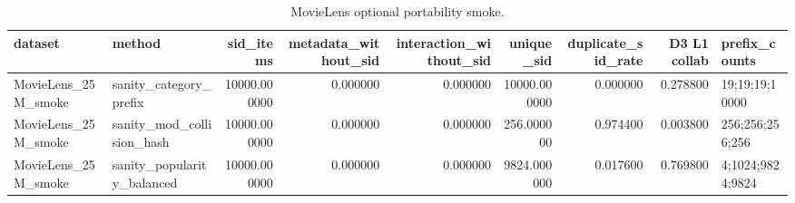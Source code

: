 \begin{table}
\caption{MovieLens optional portability smoke.}
\label{tab:movielens-portability}
\begin{tabular}{llrrrrrrl}
\toprule
dataset & method & sid\_items & metadata\_without\_sid & interaction\_without\_sid & unique\_sid & duplicate\_sid\_rate & D3 L1 collab & prefix\_counts \\
\midrule
MovieLens\_25M\_smoke & sanity\_category\_prefix & 10000.000000 & 0.000000 & 0.000000 & 10000.000000 & 0.000000 & 0.278800 & 19;19;19;10000 \\
MovieLens\_25M\_smoke & sanity\_mod\_collision\_hash & 10000.000000 & 0.000000 & 0.000000 & 256.000000 & 0.974400 & 0.003800 & 256;256;256;256 \\
MovieLens\_25M\_smoke & sanity\_popularity\_balanced & 10000.000000 & 0.000000 & 0.000000 & 9824.000000 & 0.017600 & 0.769800 & 4;1024;9824;9824 \\
\bottomrule
\end{tabular}
\end{table}

